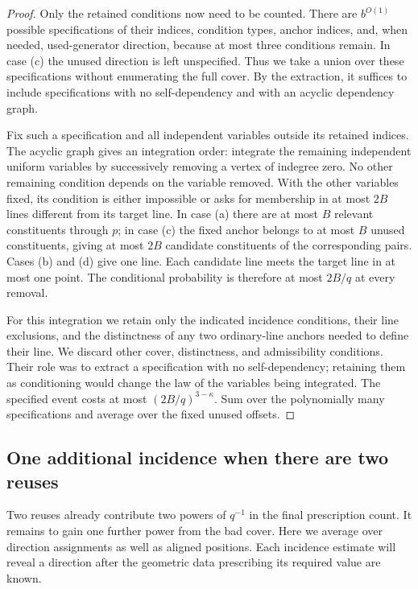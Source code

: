 \begin{proof}
Only the retained conditions now need to be counted.  There are
$b^{O(1)}$ possible specifications of their indices, condition types,
anchor indices, and, when needed, used-generator direction, because at
most three conditions remain.  In case (c) the unused direction is left
unspecified.  Thus we take a union over these specifications without
enumerating the full cover.  By the extraction, it suffices to include
specifications with no self-dependency and with an acyclic dependency
graph.

Fix such a specification and all independent variables outside its
retained indices.  The acyclic graph gives an integration order: integrate
the remaining independent uniform variables by
successively removing a vertex of indegree zero.  No other remaining
condition depends on the variable removed.  With the other variables
fixed, its condition is either impossible or asks for membership in at
most $2B$ lines different from its target line.  In case (a) there are at
most $B$ relevant constituents through $p$; in case (c) the fixed anchor
belongs to at most $B$ unused constituents, giving at most $2B$ candidate
constituents of the corresponding pairs.  Cases (b) and (d) give one
line.  Each candidate line meets the target line in at most one point.
The conditional probability is therefore at most $2B/q$ at every removal.

For this integration we retain only the indicated incidence conditions,
their line exclusions, and the distinctness of any two ordinary-line
anchors needed to define their line.  We discard other cover, distinctness, and
admissibility conditions.  Their role was to extract a specification with
no self-dependency; retaining them as conditioning would change the law
of the variables being integrated.
The specified event costs at most $(2B/q)^{3-\kappa}$.  Sum over the
polynomially many specifications and average over the fixed unused offsets.
\end{proof}

\subsection{One additional incidence when there are two reuses}

Two reuses already contribute two powers of $q^{-1}$ in the final
prescription count.  It remains to gain one further power from the bad
cover.  Here we average over direction assignments as well as aligned
positions.  Each incidence estimate will reveal a direction after the
geometric data prescribing its required value are known.

